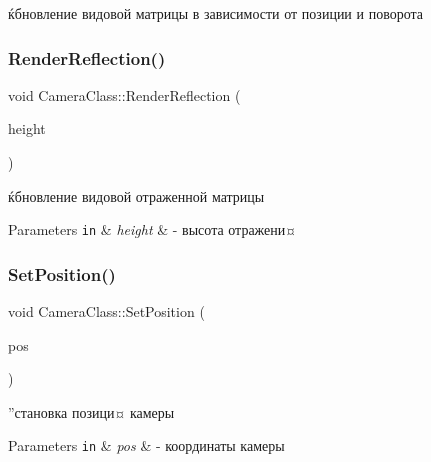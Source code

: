 ќбновление видовой матрицы в зависимости от позиции и поворота 

\mbox{\label{class_camera_class_a4207cefd6a1266aadd147095f164f805}} 
\subsubsection{\texorpdfstring{Render\+Reflection()}{RenderReflection()}}
{\footnotesize\ttfamily void Camera\+Class\+::\+Render\+Reflection (\begin{DoxyParamCaption}\item[{float}]{height }\end{DoxyParamCaption})}



ќбновление видовой отраженной матрицы 


\begin{DoxyParams}[1]{Parameters}
\mbox{\tt in}  & {\em height} & -\/ высота отражени¤ \\
\hline
\end{DoxyParams}
\mbox{\label{class_camera_class_aa3468055eb8fa3aeb552aee73bacd2e1}} 
\subsubsection{\texorpdfstring{Set\+Position()}{SetPosition()}}
{\footnotesize\ttfamily void Camera\+Class\+::\+Set\+Position (\begin{DoxyParamCaption}\item[{D3\+D\+X\+V\+E\+C\+T\+O\+R3}]{pos }\end{DoxyParamCaption})}



”становка позици¤ камеры 


\begin{DoxyParams}[1]{Parameters}
\mbox{\tt in}  & {\em pos} & -\/ координаты камеры \\
\hline
\end{DoxyParams}
\mbox{\label{class_camera_class_acb932c2317f88ba63f4a95f854ef1120}} 
